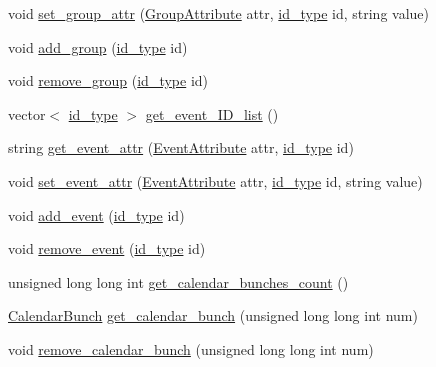 \begin{DoxyCompactItemize}
void \hyperlink{classstorage_1_1DataStorage_ae5d83b0319e6e9849dadb78c8e622d05}{set\_\-group\_\-attr} (\hyperlink{namespacestorage_abe112dd5cc72469c2ce28e3a5ea229a3}{GroupAttribute} attr, \hyperlink{types_8h_a0b60c08a3ab1435cccc5643d32d8ccee}{id\_\-type} id, string value)
\item 
void \hyperlink{classstorage_1_1DataStorage_af03714bfc767d0ee4adcf051bf771441}{add\_\-group} (\hyperlink{types_8h_a0b60c08a3ab1435cccc5643d32d8ccee}{id\_\-type} id)
\item 
void \hyperlink{classstorage_1_1DataStorage_a0bc7ee24698e6e557655c207baa1afc8}{remove\_\-group} (\hyperlink{types_8h_a0b60c08a3ab1435cccc5643d32d8ccee}{id\_\-type} id)
\item 
vector$<$ \hyperlink{types_8h_a0b60c08a3ab1435cccc5643d32d8ccee}{id\_\-type} $>$ \hyperlink{classstorage_1_1DataStorage_a1281a1f9d1d13f84c9d783957fe83778}{get\_\-event\_\-ID\_\-list} ()
\item 
string \hyperlink{classstorage_1_1DataStorage_a7d2d91d297297e8d37486dc10d3e9f41}{get\_\-event\_\-attr} (\hyperlink{namespacestorage_a6e2b156f6c0c979e3e6d80ed6ba55420}{EventAttribute} attr, \hyperlink{types_8h_a0b60c08a3ab1435cccc5643d32d8ccee}{id\_\-type} id)
\item 
void \hyperlink{classstorage_1_1DataStorage_a17a77bdcced46a81fe5a94004aec3a8d}{set\_\-event\_\-attr} (\hyperlink{namespacestorage_a6e2b156f6c0c979e3e6d80ed6ba55420}{EventAttribute} attr, \hyperlink{types_8h_a0b60c08a3ab1435cccc5643d32d8ccee}{id\_\-type} id, string value)
\item 
void \hyperlink{classstorage_1_1DataStorage_ac477bff8893b021ac4452b4fd7100557}{add\_\-event} (\hyperlink{types_8h_a0b60c08a3ab1435cccc5643d32d8ccee}{id\_\-type} id)
\item 
void \hyperlink{classstorage_1_1DataStorage_a91e36c011ef731e252118ac8d66dbed3}{remove\_\-event} (\hyperlink{types_8h_a0b60c08a3ab1435cccc5643d32d8ccee}{id\_\-type} id)
\item 
unsigned long long int \hyperlink{classstorage_1_1DataStorage_a0836f261c2cc88b382197a6cecf67b7e}{get\_\-calendar\_\-bunches\_\-count} ()
\item 
\hyperlink{structstorage_1_1CalendarBunch__}{CalendarBunch} \hyperlink{classstorage_1_1DataStorage_a6f445af69b7ba9d9c84d0d8412a537f7}{get\_\-calendar\_\-bunch} (unsigned long long int num)
\item 
void \hyperlink{classstorage_1_1DataStorage_ab825a572ae207a374fdbafbae1dc783f}{remove\_\-calendar\_\-bunch} (unsigned long long int num)
\item 

\end{DoxyCompactItemize}
